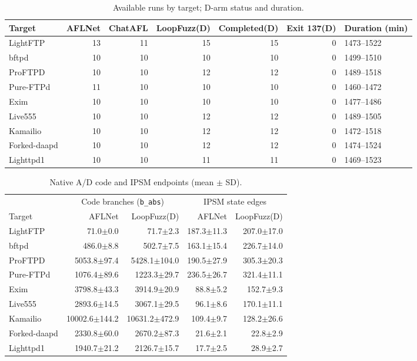 \begin{table}[!tbp]
\centering\small
\caption{Available runs by target; D-arm status and duration.}
\label{tab:observed_inventory}
\begin{tabular}{lrrrrrl}
\toprule
Target & AFLNet & ChatAFL & LoopFuzz(D) & Completed(D) & Exit 137(D) & Duration (min) \\
\midrule
LightFTP & 13 & 11 & 15 & 15 & 0 & 1473--1522 \\
bftpd & 10 & 10 & 10 & 10 & 0 & 1499--1510 \\
ProFTPD & 10 & 10 & 12 & 12 & 0 & 1489--1518 \\
Pure-FTPd & 11 & 10 & 10 & 10 & 0 & 1460--1472 \\
Exim & 10 & 10 & 10 & 10 & 0 & 1477--1486 \\
Live555 & 10 & 10 & 12 & 12 & 0 & 1489--1505 \\
Kamailio & 10 & 10 & 12 & 12 & 0 & 1472--1518 \\
Forked-daapd & 10 & 10 & 12 & 12 & 0 & 1474--1524 \\
Lighttpd1 & 10 & 10 & 11 & 11 & 0 & 1469--1523 \\
\bottomrule
\end{tabular}
\end{table}
\begin{table}[!tbp]
\centering\small
\caption{Native A/D code and IPSM endpoints (mean $\pm$ SD).}
\label{tab:observed_endpoints}
\begin{tabular}{lrrrr}
\toprule
 & \multicolumn{2}{c}{Code branches (\texttt{b\_abs})} & \multicolumn{2}{c}{IPSM state edges} \\
Target & AFLNet & LoopFuzz(D) & AFLNet & LoopFuzz(D) \\
\midrule
LightFTP & 71.0$\pm$0.0 & 71.7$\pm$2.3 & 187.3$\pm$11.3 & 207.0$\pm$17.0 \\
bftpd & 486.0$\pm$8.8 & 502.7$\pm$7.5 & 163.1$\pm$15.4 & 226.7$\pm$14.0 \\
ProFTPD & 5053.8$\pm$97.4 & 5428.1$\pm$104.0 & 190.5$\pm$27.9 & 305.3$\pm$20.3 \\
Pure-FTPd & 1076.4$\pm$89.6 & 1223.3$\pm$29.7 & 236.5$\pm$26.7 & 321.4$\pm$11.1 \\
Exim & 3798.8$\pm$43.3 & 3914.9$\pm$20.9 & 88.8$\pm$5.2 & 152.7$\pm$9.3 \\
Live555 & 2893.6$\pm$14.5 & 3067.1$\pm$29.5 & 96.1$\pm$8.6 & 170.1$\pm$11.1 \\
Kamailio & 10002.6$\pm$144.2 & 10631.2$\pm$472.9 & 109.4$\pm$9.7 & 128.2$\pm$26.6 \\
Forked-daapd & 2330.8$\pm$60.0 & 2670.2$\pm$87.3 & 21.6$\pm$2.1 & 22.8$\pm$2.9 \\
Lighttpd1 & 1940.7$\pm$21.2 & 2126.7$\pm$15.7 & 17.7$\pm$2.5 & 28.9$\pm$2.7 \\
\bottomrule
\end{tabular}
\end{table}

